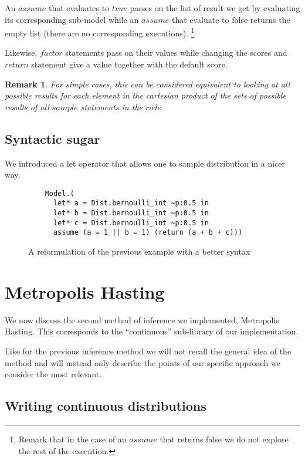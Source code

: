 \documentclass{article}
\newtheorem{remark}{Remark}
\begin{document}
An $assume$ that evaluates to $true$ passes on the list of result we get by
evaluating its corresponding sub-model while an $assume$ that evaluate to false
returns the empty list (there are no corresponding executions).
\footnote{Remark that in the case of an $assume$ that returns false we do not
	explore the rest of the execution.}

Likewise, $factor$ statements pass on their values while changing the scores
and $return$ statement give a value together with the default score.

\begin{remark}
	For simple cases, this can be considered equivalent to looking at all
	possible results for each element in the cartesian product of the sets of
	possible results of all $sample$ statements in the code.
\end{remark}

\subsection{Syntactic sugar}
\label{subseq:sugar}

We introduced a let operator that allows one to sample distribution in a nicer
way.



\begin{figure}[h]
	\centering
	\begin{verbatim}
    Model.(
      let* a = Dist.bernoulli_int ~p:0.5 in
      let* b = Dist.bernoulli_int ~p:0.5 in
      let* c = Dist.bernoulli_int ~p:0.5 in
      assume (a = 1 || b = 1) (return (a + b + c)))
	\end{verbatim}
	\caption{A reformulation of the previous example with a better syntax}
	\label{fig:sugar}
\end{figure}

\section{Metropolis Hasting}

We now discuss the second method of inference we implemented, Metropolis Hasting.
This corresponds to the ``continuous'' sub-library of our implementation.

Like for the previous inference method we will not recall the general idea of
the method and will instead only describe the points of our specific approach
we consider the most relevant.

\subsection{Writing continuous distributions}
\end{document}
